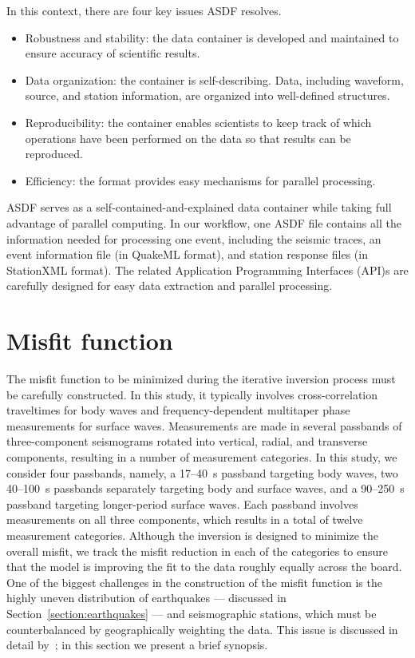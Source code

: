In this context, there are four key issues ASDF resolves.
\begin{itemize}
    \item Robustness and stability: the data container is developed and maintained to ensure accuracy of scientific results.
    \item Data organization: the container is self-describing. Data, including waveform, source, and station information, are organized into well-defined structures.
    \item Reproducibility: the container enables scientists to keep track of which operations have been performed on the data so that results can be reproduced.
    \item Efficiency: the format provides easy mechanisms for parallel processing.
\end{itemize}

ASDF serves as a self-contained-and-explained data container while taking
full advantage of parallel computing. In our workflow,
one ASDF file contains all the information needed for processing one event,
including the seismic traces, an event information file (in QuakeML format), and station response files (in StationXML format).
The related Application Programming Interfaces (API)s are carefully designed for easy data extraction and parallel processing.

\section{Misfit function}
\label{section:misfit}

The misfit function to be minimized during the iterative inversion process must
be carefully constructed.
In this study,
it typically involves cross-correlation traveltimes
for body waves and frequency-dependent multitaper phase measurements for surface waves.
Measurements are made in several passbands of three-component seismograms rotated
into vertical, radial, and transverse components, resulting in a number of measurement
categories.
In this study, we consider four passbands, namely, a 17--40~s passband targeting body waves,
two 40--100~s passbands separately targeting body and surface waves,
and a 90--250~s passband targeting longer-period surface waves.
Each passband involves measurements on all three components,
which results in a total of twelve measurement categories.
Although the inversion is designed to minimize the overall misfit,
we track the misfit reduction in each of the categories to ensure that
the model is improving the fit to the data roughly equally across the board.
One of the biggest challenges in the construction of the misfit function is the
highly uneven distribution of earthquakes --- discussed in Section~\ref{section:earthquakes} --- and seismographic stations,
which must be counterbalanced by geographically weighting the data.
This issue is discussed in detail by~\cite{Ruanetal2018};
in this section we present a brief synopsis.

